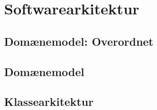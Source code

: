 \chapter{Softwarearkitektur}
\section{Domænemodel: Overordnet}
\section{Domænemodel}
\section{Klassearkitektur}
